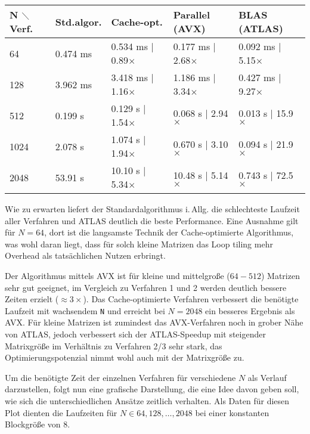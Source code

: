 \documentclass[a4paper,11pt]{scrartcl}
\newcommand{\iAllg}{\mbox{i.\,Allg.}\xspace}
\begin{document}
\begin{center}
\begin{tabular}{| l | l || l || l || l |}
\hline
N $\diagdown$ Verf. & Std.algor. & Cache-opt. & Parallel (AVX) & BLAS (ATLAS)  \\ \hline

64 & 0.474 ms & 0.534 ms | 0.89$\times$ & 0.177 ms | 2.68$\times$ & 0.092 ms | 5.15$\times$  \\ \hline
128 & 3.962 ms & 3.418 ms | 1.16$\times$ & 1.186 ms | 3.34$\times$ & 0.427 ms | 9.27$\times$  \\ \hline 
\hline
512 & 0.199 s & 0.129 s | 1.54$\times$ & 0.068 s | 2.94$\times$ & 0.013 s | 15.9$\times$  \\ \hline
1024 & 2.078 s &  1.074 s | 1.94$\times$ & 0.670 s | 3.10$\times$ & 0.094 s | 21.9$\times$ \\ \hline
2048 & 53.91 s & 10.10 s | 5.34$\times$ & 10.48 s | 5.14$\times$ & 0.743 s | 72.5$\times$ \\ \hline
\end{tabular}
\end{center}

Wie zu erwarten liefert der Standardalgorithmus \iAllg die schlechteste Laufzeit aller 
Verfahren und ATLAS deutlich die beste Performance.
Eine Ausnahme gilt für $N=64$, dort ist die langsamste Technik der Cache-optimierte
Algorithmus, was wohl daran liegt, dass für solch kleine Matrizen das Loop tiling mehr
Overhead als tatsächlichen Nutzen erbringt.\newline

Der Algorithmus mittels AVX ist für kleine und mittelgroße ($64-512$) Matrizen sehr gut
geeignet, im Vergleich zu Verfahren 1 und 2 werden deutlich bessere Zeiten erzielt
($\approx 3\times$).
Das Cache-optimierte Verfahren verbessert die benötigte Laufzeit mit wachsendem \texttt{N}
und erreicht bei $N=2048$ ein besseres Ergebnis als AVX. Für kleine Matrizen ist zumindest das AVX-Verfahren noch in grober Nähe von ATLAS,
jedoch verbessert sich der ATLAS-Speedup mit steigender Matrixgröße im Verhältnis
zu Verfahren 2/3 sehr stark, das Optimierungspotenzial nimmt wohl auch mit der Matrixgröße zu.
\newline

Um die benötigte Zeit der einzelnen Verfahren für verschiedene $N$ als Verlauf darzustellen,
folgt nun eine grafische Darstellung, die eine Idee davon geben soll, wie sich die unterschiedlichen
Ansätze zeitlich verhalten. Als Daten für diesen Plot dienten die Laufzeiten für $N \in 64, 128, \ldots ,
2048$ bei einer konstanten Blockgröße von $8$.
\end{document}
